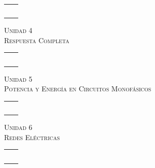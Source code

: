 \documentclass[11pt,a4paper,twocolumn]{article}
\newcommand{\unidad}[2]{\begin{center}
		\fontsize{10}{10}\selectfont\color{gray!50!black}\scshape Unidad #1 \\
		\fontsize{14}{14}\selectfont \scshape #2
\end{center}}
\begin{document}
	\begin{tabular}{r | l} \vspace{.2cm}
		& \\ \vspace{.2cm}
		& \\ \vspace{.2cm}
		& \\ \vspace{.2cm}
		& \\ \vspace{.2cm}
		& \\ 
		
	\end{tabular}
	
	\unidad{4}{Respuesta Completa}
	
	
	\begin{tabular}{r | l} \vspace{.2cm}
		& \\ \vspace{.2cm}
		& \\ \vspace{.2cm}
		& \\ \vspace{.2cm}
		& \\ \vspace{.2cm}
		& \\ 
		
	\end{tabular}
	
	\unidad{5}{Potencia y Energía en Circuitos Monofásicos}
	
	
	\begin{tabular}{r | l} \vspace{.2cm}
		& \\ \vspace{.2cm}
		& \\ \vspace{.2cm}
		& \\ \vspace{.2cm}
		& \\ \vspace{.2cm}
		& \\ 
		
	\end{tabular}
	
	\unidad{6}{Redes Eléctricas}
	
	
	\begin{tabular}{r | l} \vspace{.2cm}
		& \\ \vspace{.2cm}
		& \\ \vspace{.2cm}
		& \\ \vspace{.2cm}
		& \\ \vspace{.2cm}
		& \\ 
		
	\end{tabular}
	
\end{document}
